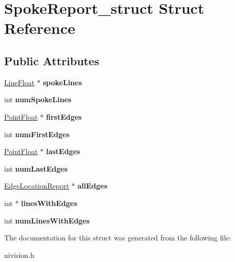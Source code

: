 \hypertarget{structSpokeReport__struct}{\section{\-Spoke\-Report\-\_\-struct \-Struct \-Reference}
\label{structSpokeReport__struct}
}
\subsection*{\-Public \-Attributes}
\begin{DoxyCompactItemize}
\item 
\hypertarget{structSpokeReport__struct_a9466942d6c5cd4288866029c7ed49b8e}{\hyperlink{structLineFloat__struct}{\-Line\-Float} $\ast$ {\bfseries spoke\-Lines}}\label{structSpokeReport__struct_a9466942d6c5cd4288866029c7ed49b8e}

\item 
\hypertarget{structSpokeReport__struct_a7c4b28d89e7ba38554d3f65215c43e1b}{int {\bfseries num\-Spoke\-Lines}}\label{structSpokeReport__struct_a7c4b28d89e7ba38554d3f65215c43e1b}

\item 
\hypertarget{structSpokeReport__struct_ad6c95f076bf7d190229be06eccb9de4f}{\hyperlink{structPointFloat__struct}{\-Point\-Float} $\ast$ {\bfseries first\-Edges}}\label{structSpokeReport__struct_ad6c95f076bf7d190229be06eccb9de4f}

\item 
\hypertarget{structSpokeReport__struct_a58328fa9e8a84cc0235f2f1e0ff67a33}{int {\bfseries num\-First\-Edges}}\label{structSpokeReport__struct_a58328fa9e8a84cc0235f2f1e0ff67a33}

\item 
\hypertarget{structSpokeReport__struct_a9de506b9d5a065ac4d34b9694166d2a1}{\hyperlink{structPointFloat__struct}{\-Point\-Float} $\ast$ {\bfseries last\-Edges}}\label{structSpokeReport__struct_a9de506b9d5a065ac4d34b9694166d2a1}

\item 
\hypertarget{structSpokeReport__struct_aba6c8802a5247ae6cb680353c3abb5e5}{int {\bfseries num\-Last\-Edges}}\label{structSpokeReport__struct_aba6c8802a5247ae6cb680353c3abb5e5}

\item 
\hypertarget{structSpokeReport__struct_a71b87018515f530defe16fbe5c23717a}{\hyperlink{structEdgeLocationReport__struct}{\-Edge\-Location\-Report} $\ast$ {\bfseries all\-Edges}}\label{structSpokeReport__struct_a71b87018515f530defe16fbe5c23717a}

\item 
\hypertarget{structSpokeReport__struct_a91c1a079f0abaa87e6b88ea2f3bc0d2c}{int $\ast$ {\bfseries lines\-With\-Edges}}\label{structSpokeReport__struct_a91c1a079f0abaa87e6b88ea2f3bc0d2c}

\item 
\hypertarget{structSpokeReport__struct_a705496f23f7d9e3263951c4d05d46a9a}{int {\bfseries num\-Lines\-With\-Edges}}\label{structSpokeReport__struct_a705496f23f7d9e3263951c4d05d46a9a}

\end{DoxyCompactItemize}


\-The documentation for this struct was generated from the following file\-:\begin{DoxyCompactItemize}
\item 
nivision.\-h\end{DoxyCompactItemize}
